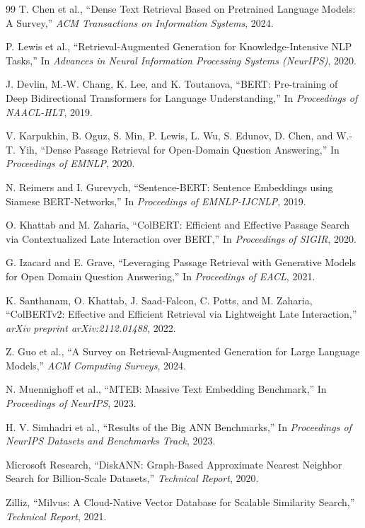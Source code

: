 \documentclass{ieeeaccess}
\begin{document}
\begin{thebibliography}{99}
T. Chen et al.,
``Dense Text Retrieval Based on Pretrained Language Models: A Survey,''
\emph{ACM Transactions on Information Systems}, 2024.

P. Lewis et al.,
``Retrieval-Augmented Generation for Knowledge-Intensive NLP Tasks,''
In \emph{Advances in Neural Information Processing Systems (NeurIPS)}, 2020.

J. Devlin, M.-W. Chang, K. Lee, and K. Toutanova,
``BERT: Pre-training of Deep Bidirectional Transformers for Language Understanding,''
In \emph{Proceedings of NAACL-HLT}, 2019.

V. Karpukhin, B. Oguz, S. Min, P. Lewis, L. Wu, S. Edunov, D. Chen, and W.-T. Yih,
``Dense Passage Retrieval for Open-Domain Question Answering,''
In \emph{Proceedings of EMNLP}, 2020.

N. Reimers and I. Gurevych,
``Sentence-BERT: Sentence Embeddings using Siamese BERT-Networks,''
In \emph{Proceedings of EMNLP-IJCNLP}, 2019.

O. Khattab and M. Zaharia,
``ColBERT: Efficient and Effective Passage Search via Contextualized Late Interaction over BERT,''
In \emph{Proceedings of SIGIR}, 2020.

G. Izacard and E. Grave,
``Leveraging Passage Retrieval with Generative Models for Open Domain Question Answering,''
In \emph{Proceedings of EACL}, 2021.

K. Santhanam, O. Khattab, J. Saad-Falcon, C. Potts, and M. Zaharia,
``ColBERTv2: Effective and Efficient Retrieval via Lightweight Late Interaction,''
\emph{arXiv preprint arXiv:2112.01488}, 2022.

Z. Guo et al.,
``A Survey on Retrieval-Augmented Generation for Large Language Models,''
\emph{ACM Computing Surveys}, 2024.

N. Muennighoff et al.,
``MTEB: Massive Text Embedding Benchmark,''
In \emph{Proceedings of NeurIPS}, 2023.

H. V. Simhadri et al.,
``Results of the Big ANN Benchmarks,''
In \emph{Proceedings of NeurIPS Datasets and Benchmarks Track}, 2023.

Microsoft Research,
``DiskANN: Graph-Based Approximate Nearest Neighbor Search for Billion-Scale Datasets,''
\emph{Technical Report}, 2020.

Zilliz,
``Milvus: A Cloud-Native Vector Database for Scalable Similarity Search,''
\emph{Technical Report}, 2021.


\end{thebibliography}
\end{document}
